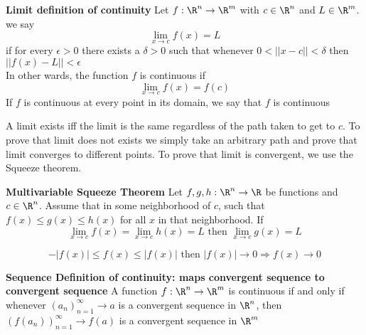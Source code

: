 \documentclass[11pt]{article}
\begin{document}
\begin{defn}
  \label{limit defn of continuity}
  \textbf{Limit definition of continuity} Let $f:\R^n \to\R^m$ with $c\in\R^n$ and $L\in\R^m$. we say
  \[
    \lim_{x\to c} f(x) = L
  \]
  if for every $\epsilon > 0$ there exists a $\delta > 0$ such that whenever $0< || x-c || < \delta$ then $|| f(x)-L || < \epsilon$ \\
  In other wards, the function $f$ is continuous if
  \[
    \lim_{x\to c} f(x) = f(c)
  \]
  If $f$ is continuous at every point in its domain, we say that $f$ is continuous
  \begin{rem}
    A limit exists iff the limit is the same regardless of the path taken to get to $c$. To prove that limit does not exists we simply take an arbitrary path and prove that limit converges to different points. To prove that limit is convergent, we use the Squeeze theorem.
  \end{rem}
\end{defn}


\begin{theorem}
  \label{Multivariable Squeeze Theorem}
  \textbf{Multivariable Squeeze Theorem} Let $f,g,h: \R^n \to \R$ be functions and $c\in\R^n$. Assume that in some neighborhood of $c$, such that $f(x)\leq g(x)\leq h(x)$ for all $x$ in that neighborhood. If
  \[
    \lim_{x\to c} f(x) = \lim_{x\to c} h(x) = L \text{   then   }  \lim_{x\to c}g(x) = L
  \]
  \begin{rem}
    \[
      -| f(x) | \leq f(x) \leq |f(x)| \text{ then } |f(x)|\to 0 \Rightarrow f(x)\to 0
    \]
  \end{rem}
\end{theorem}

\begin{theorem*}
  \label{Sequence definition of continuity}
  \textbf{Sequence Definition of continuity: maps convergent sequence to convergent sequence} A function $f:\R^n\to \R^m$ is continuous if and only if whenever $(a_n)_{n=1}^{\infty} \to a$ is a convergent sequence in $\R^n$, then $(f(a_n))_{n=1}^{\infty} \to f(a)$ is a convergent sequence in $\R^m$
\end{theorem*}
\end{document}

